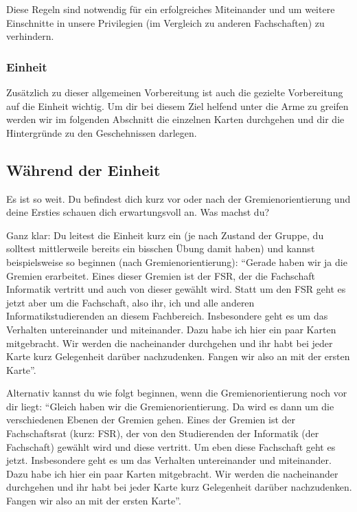 \documentclass[a4paper,11pt]{scrartcl} %
\begin{document}
Diese Regeln sind notwendig für ein erfolgreiches Miteinander und um weitere Einschnitte in unsere Privilegien (im Vergleich zu anderen Fachschaften) zu verhindern.

\subsubsection*{Einheit}

Zusätzlich zu dieser allgemeinen Vorbereitung ist auch die gezielte Vorbereitung auf die Einheit wichtig. Um dir bei diesem Ziel helfend unter die Arme zu greifen werden wir im folgenden Abschnitt die einzelnen Karten durchgehen und dir die Hintergründe zu den Geschehnissen darlegen.


  \subsection{Während der Einheit} %
Es ist so weit. Du befindest dich kurz vor oder nach der Gremienorientierung und deine Ersties schauen dich erwartungsvoll an. Was machst du?

Ganz klar: Du leitest die Einheit kurz ein (je nach Zustand der Gruppe, du solltest mittlerweile bereits ein bisschen Übung damit haben) und kannst beispielsweise so beginnen (nach Gremienorientierung): "`Gerade haben wir ja die Gremien erarbeitet. Eines dieser Gremien ist der FSR, der die Fachschaft Informatik vertritt und auch von dieser gewählt wird. Statt um den FSR geht es jetzt aber um die Fachschaft, also ihr, ich und alle anderen Informatikstudierenden an diesem Fachbereich.
Insbesondere geht es um das Verhalten untereinander und miteinander. Dazu habe ich hier ein paar Karten mitgebracht. Wir werden die nacheinander durchgehen und ihr habt bei jeder Karte kurz Gelegenheit darüber nachzudenken. Fangen wir also an mit der ersten Karte"'. 

Alternativ kannst du wie folgt beginnen, wenn die Gremienorientierung noch vor dir liegt: "`Gleich haben wir die Gremienorientierung. Da wird es dann um die verschiedenen Ebenen der Gremien gehen. Eines der Gremien ist der Fachschaftsrat (kurz: FSR), der von den Studierenden der Informatik (der Fachschaft) gewählt wird und diese vertritt. Um eben diese Fachschaft geht es jetzt.
Insbesondere geht es um das Verhalten untereinander und miteinander. Dazu habe ich hier ein paar Karten mitgebracht. Wir werden die nacheinander durchgehen und ihr habt bei jeder Karte kurz Gelegenheit darüber nachzudenken. Fangen wir also an mit der ersten Karte"'.
\end{document}

